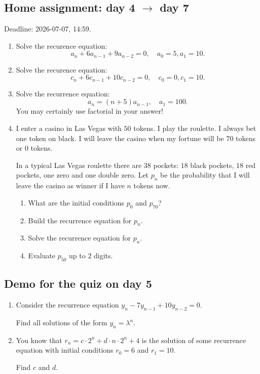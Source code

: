 \documentclass[12pt]{article}
\begin{document}





\subsection*{Home assignment: day 4 $\to$ day 7}

Deadline: 2026-07-07, 14:59. 

\begin{enumerate}
    \item Solve the recurence equation:
    \[
    a_n + 6 a_{n-1} + 9 a_{n-2} = 0, \quad a_0 = 5, a_1 = 10.
    \]
    \item Solve the recurence equation:
    \[
    c_n + 6 c_{n-1} + 10 c_{n-2} = 0, \quad c_0 = 0, c_1 = 10.
    \]
    \item Solve the recurrence equation: 
    \[
    a_n = (n + 5) a_{n-1}, \quad a_1 = 100.
    \]
    You may certainly use factorial in your answer! 
    \item I enter a casino in Las Vegas with $50$ tokens. I play the roulette.
I always bet one token on black. I will leave the casino when my fortune will be $70$ tokens or $0$ tokens. 

In a typical Las Vegas roulette there are $38$ pockets: $18$ black pockets, $18$ red pockets, one zero and one double zero.
Let $p_n$ be the probability that I will leave the casino as winner if I have $n$ tokens now. 
\begin{enumerate}[label=\alph*)]
    \item What are the initial conditions $p_0$ and $p_{70}$?
    \item Build the recurrence equation for $p_n$. 
    \item Solve the recurrence equation for $p_n$.
    \item Evaluate $p_{50}$ up to $2$ digits. 
\end{enumerate}
\end{enumerate}

\subsection*{Demo for the quiz on day 5}

\begin{enumerate} 
    \item Consider the recurrence equation $y_n - 7 y_{n-1} + 10 y_{n-2} = 0$.
    
    Find all solutions of the form $y_n = \lambda^n$.
    \item You know that $r_n = c \cdot 2^n + d \cdot n \cdot 2^n + 4$ is the solution of some recurrence equation with initial conditions  $r_0 = 6$ and $r_1 = 10$.
    
    Find $c$ and $d$. 
\end{enumerate}
\end{document}

